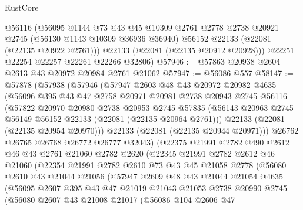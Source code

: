 \begin{lexlean}{RustCore}
\begin{coremodule}
        @56116
        (@56095
          @1144
          @73
          @43
          @45
          @10309
          @2761
          @2778
          @2738
          @20921
          @2745
          (@56130 @1143 @10309 @36936 @36940)
          @56152
          @22133
          (@22081 (@22135 @20922 @2761)))
        @22133
        (@22081 (@22135 @20912 @20928)))
      @22251
      @22254
      @22257
      @22261
      @22266
      @32806)
@57946 := @57863 @20938 @2604 @2613 @43 @20972 @20984 @2761 @21062
@57947 := @56086 @557
@58147 := @57878
    (@57938
      (@57946
        (@57947
          @2603
          @48
          @43
          @20972
          @20982
          @4635
          (@56096
            @395
            @43
            @47
            @2758
            @20971
            @20981
            @2738
            @20943
            @2745
            @56116
            (@57822
              @20970
              @20980
              @2738
              @20953
              @2745
              @57835
              (@56143 @20963 @2745 @56149 @56152 @22133 (@22081 (@22135 @20964 @2761)))
              @22133
              (@22081 (@22135 @20954 @20970)))
            @22133
            (@22081 (@22135 @20944 @20971)))
          @26762
          @26765
          @26768
          @26772
          @26777
          @32043)
        (@22375
          @21991
          @2782
          @490
          @2612
          @46
          @43
          @2761
          @21060
          @2782
          @2620
          (@22345
            @21991
            @2782
            @2612
            @46
            @21060
            (@22354
              @21991
              @2782
              @2610
              @73
              @43
              @45
              @21058
              @2778
              (@56080
                @2610
                @43
                @21044
                @21056
                (@57947
                  @2609
                  @48
                  @43
                  @21044
                  @21054
                  @4635
                  (@56095
                    @2607
                    @395
                    @43
                    @47
                    @21019
                    @21043
                    @21053
                    @2738
                    @20990
                    @2745
                    (@56080
                      @2607
                      @43
                      @21008
                      @21017
                      (@56086
                        @104
                        @2606
                        @47

\end{coremodule}
\end{lexlean}
